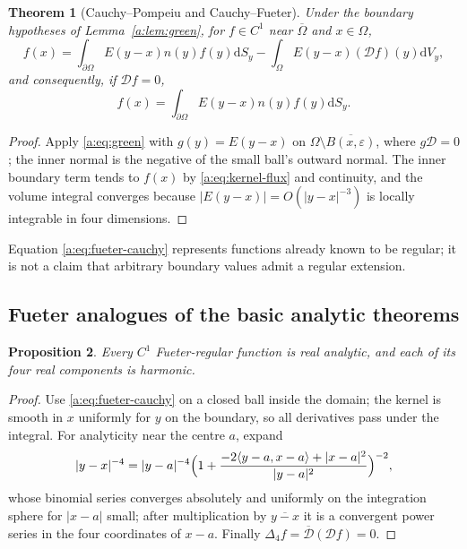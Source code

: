 \documentclass[11pt,a4paper]{article}
\numberwithin{equation}{section}
\newtheorem{theorem}{Theorem}[section]
\newtheorem{proposition}[theorem]{Proposition}
\theoremstyle{definition}
\theoremstyle{remark}
\theoremstyle{plain}
\newcommand{\Dop}{\mathcal D}
\newcommand{\lap}{\Delta_4}
\newcommand{\Om}{\Omega}
\newcommand{\abs}[1]{\lvert #1\rvert}
\newcommand{\dd}{\mathrm d}
\begin{document}
\begin{theorem}[Cauchy--Pompeiu and Cauchy--Fueter]
\label{a:thm:fueter-cauchy}
Under the boundary hypotheses of Lemma~\ref{a:lem:green}, for $f\in C^1$ near
$\overline\Om$ and $x\in\Om$,
\begin{equation}
 f(x)=\int_{\partial\Om}E(y-x)n(y)f(y)\dd S_y
      -\int_\Om E(y-x)(\Dop f)(y)\dd V_y ,
 \label{a:eq:pompeiu}
\end{equation}
and consequently, if $\Dop f=0$,
\begin{equation}
 f(x)=\int_{\partial\Om}E(y-x)n(y)f(y)\dd S_y .
 \label{a:eq:fueter-cauchy}
\end{equation}
\end{theorem}

\begin{proof}
Apply \eqref{a:eq:green} with $g(y)=E(y-x)$ on
$\Om\setminus\overline{B(x,\varepsilon)}$, where $g\Dop=0$; the inner normal
is the negative of the small ball's outward normal. The inner boundary term
tends to $f(x)$ by \eqref{a:eq:kernel-flux} and continuity, and the volume
integral converges because $\abs{E(y-x)}=O(\abs{y-x}^{-3})$ is locally
integrable in four dimensions.
\end{proof}

Equation \eqref{a:eq:fueter-cauchy} represents functions already known to be
regular; it is not a claim that arbitrary boundary values admit a regular
extension.

\subsection{Fueter analogues of the basic analytic theorems}
\label{a:sec:fueter-consequences}

\begin{proposition}
\label{a:prop:fueter-analytic}
Every $C^1$ Fueter-regular function is real analytic, and each of its four
real components is harmonic.
\end{proposition}

\begin{proof}
Use \eqref{a:eq:fueter-cauchy} on a closed ball inside the domain; the kernel
is smooth in $x$ uniformly for $y$ on the boundary, so all derivatives pass
under the integral. For analyticity near the centre $a$, expand
\[
 \abs{y-x}^{-4}=\abs{y-a}^{-4}
 \Bigl(1+\frac{-2\langle y-a,x-a\rangle+\abs{x-a}^2}{\abs{y-a}^2}\Bigr)^{-2},
\]
whose binomial series converges absolutely and uniformly on the integration
sphere for $\abs{x-a}$ small; after multiplication by $\overline{y-x}$ it is a
convergent power series in the four coordinates of $x-a$. Finally
$\lap f=\overline{\Dop}(\Dop f)=0$.
\end{proof}
\end{document}
